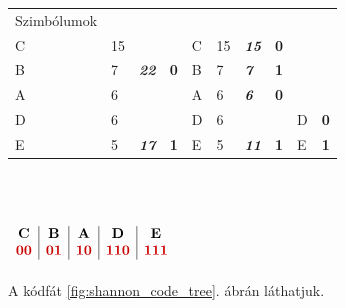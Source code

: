 \documentclass[12pt,margin=0px]{article}
\begin{document}
    \renewcommand{\arraystretch}{1.6}
    {\footnotesize
        \noindent \begin{tabular}{llll|llll|ll}
        Szimbólumok &    &           &             &   &    &           &             &   &           \\
        C       & 15 & {\color[HTML]{010066} }           & {\color[HTML]{CB0000} }         & C & 15 & {\color[HTML]{00009B} \textit{\textbf{15}}}           & {\color[HTML]{CB0000} \textbf{0}}           &   &           \\ \cline{5-8}
        B       & 7  & \multirow{-2}{*}{{\color[HTML]{010066} \textit{\textbf{22}}}} & \multirow{-2}{*}{{\color[HTML]{CB0000} \textbf{0}}} & B & 7  & {\color[HTML]{00009B} \textit{\textbf{7}}}    & {\color[HTML]{CB0000} \textbf{1}}           &   &           \\ \cline{1-4}
        A       & 6  & {\color[HTML]{010066} }           & {\color[HTML]{CB0000} }         & A & 6  & {\color[HTML]{00009B} \textit{\textbf{6}}}    & {\color[HTML]{CB0000} \textbf{0}}           &   &           \\ \cline{5-8}
        D       & 6  & {\color[HTML]{010066} }           & {\color[HTML]{CB0000} }         & D & 6  & {\color[HTML]{00009B} }           & {\color[HTML]{CB0000} }         & D & {\color[HTML]{CB0000} \textbf{0}} \\ \cline{9-10}
        E       & 5  & \multirow{-3}{*}{{\color[HTML]{010066} \textit{\textbf{17}}}} & \multirow{-3}{*}{{\color[HTML]{CB0000} \textbf{1}}} & E & 5  & \multirow{-2}{*}{{\color[HTML]{00009B} \textit{\textbf{11}}}} & \multirow{-2}{*}{{\color[HTML]{CB0000} \textbf{1}}} & E & {\color[HTML]{CB0000} \textbf{1}}
        \end{tabular}\\\\
    }
    \renewcommand{\arraystretch}{1}

    \noindent $\begin{array}{c|c|c|c|c}
      \textbf{C} & \textbf{B} & \textbf{A} & \textbf{D} & \textbf{E} \\
      {\color[HTML]{CB0000} \textbf{00}} & {\color[HTML]{CB0000} \textbf{01}} & {\color[HTML]{CB0000} \textbf{10}} & {\color[HTML]{CB0000} \textbf{110}} & {\color[HTML]{CB0000} \textbf{111}}\\
    \end{array}$\\\\

    \noindent A kódfát \ref{fig:shannon_code_tree}. ábrán láthatjuk.
\end{document}
